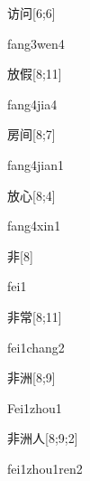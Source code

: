 \begin{verbete}{访问}[6;6]
\begin{pronuncia}{fang3wen4}
\end{pronuncia}
\end{verbete}

\begin{verbete}{放假}[8;11]
\begin{pronuncia}{fang4jia4}
\end{pronuncia}
\end{verbete}

\begin{verbete}{房间}[8;7]
\begin{pronuncia}{fang4jian1}
\end{pronuncia}
\end{verbete}

\begin{verbete}{放心}[8;4]
\begin{pronuncia}{fang4xin1}
\end{pronuncia}
\end{verbete}

\begin{verbete}[fei1]{非}[8]
\begin{pronuncia}{fei1}
\end{pronuncia}
\end{verbete}

\begin{verbete}{非常}[8;11]
\begin{pronuncia}{fei1chang2}
\end{pronuncia}
\end{verbete}

\begin{verbete}{非洲}[8;9]
\begin{pronuncia}{Fei1zhou1}
\end{pronuncia}
\end{verbete}

\begin{verbete}{非洲人}[8;9;2]
\begin{pronuncia}{fei1zhou1ren2}
\end{pronuncia}
\end{verbete}

